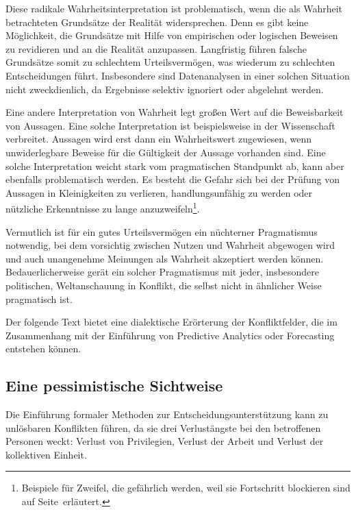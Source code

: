 Diese radikale Wahrheitsinterpretation ist problematisch, wenn die als Wahrheit
betrachteten Grundsätze der Realität widersprechen. Denn es gibt keine
Möglichkeit, die Grundsätze mit Hilfe von empirischen oder logischen Beweisen
zu revidieren und an die Realität anzupassen. Langfristig führen falsche
Grundsätze somit zu schlechtem Urteilsvermögen, was wiederum zu schlechten
Entscheidungen führt. Insbesondere sind Datenanalysen in einer solchen Situation
nicht zweckdienlich, da Ergebnisse selektiv ignoriert oder abgelehnt werden.

Eine andere Interpretation von Wahrheit legt großen Wert auf die Beweisbarkeit
von Aussagen. Eine solche Interpretation ist beispielsweise in der Wissenschaft
verbreitet. Aussagen wird erst dann ein Wahrheitswert zugewiesen, wenn
unwiderlegbare Beweise für die Gültigkeit der Aussage vorhanden sind. Eine
solche Interpretation weicht stark vom pragmatischen Standpunkt ab, kann aber
ebenfalls problematisch werden. Es besteht die Gefahr sich bei der Prüfung von
Aussagen in Kleinigkeiten zu verlieren, handlungsunfähig zu werden oder
nützliche Erkenntnisse zu lange anzuzweifeln\footnote{
Beispiele für Zweifel, die gefährlich werden, weil sie Fortschritt blockieren
sind auf Seite~\xcom erläutert.
}.

Vermutlich ist für ein gutes Urteilsvermögen ein nüchterner Pragmatismus
notwendig, bei dem vorsichtig zwischen Nutzen und Wahrheit abgewogen wird und
auch unangenehme Meinungen als Wahrheit akzeptiert werden können.
Bedauerlicherweise gerät ein solcher Pragmatismus mit jeder, insbesondere
politischen, Weltanschauung in Konflikt, die selbst nicht in ähnlicher Weise
pragmatisch ist.

Der folgende Text bietet eine dialektische Erörterung der Konfliktfelder, die im
Zusammenhang mit der Einführung von Predictive Analytics oder Forecasting entstehen
können.


\subsection{Eine pessimistische Sichtweise}

Die Einführung formaler Methoden zur Entscheidungsunterstützung kann zu unlösbaren Konflikten führen,
da sie drei Verlustängste bei den betroffenen Personen weckt: Verlust von Privilegien,
Verlust der Arbeit und Verlust der kollektiven Einheit. 

